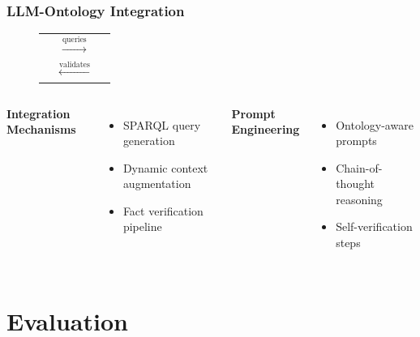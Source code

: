 \documentclass{beamer}
\begin{document}
\begin{frame}
\frametitle{LLM-Ontology Integration}

\begin{figure}
\centering
\begin{tabular}{ccc}
\fbox{\begin{minipage}{2.5cm}\centering\textbf{LLM}\end{minipage}} & 
$\xrightarrow{\text{queries}}$ & 
\fbox{\begin{minipage}{2.5cm}\centering\textbf{Ontology}\end{minipage}} \\
 & $\xleftarrow{\text{validates}}$ & 
\end{tabular}
\end{figure}

\begin{columns}
\textbf{Integration Mechanisms}
\begin{itemize}
    \item SPARQL query generation
    \item Dynamic context augmentation
    \item Fact verification pipeline
\end{itemize}

\textbf{Prompt Engineering}
\begin{itemize}
    \item Ontology-aware prompts
    \item Chain-of-thought reasoning
    \item Self-verification steps
\end{itemize}
\end{columns}
\end{frame}

\section{Evaluation}
\end{document}
